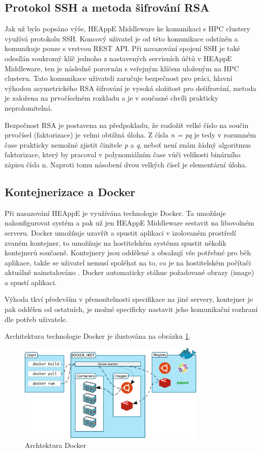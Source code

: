 \subsection{Protokol SSH a metoda šifrování RSA}
Jak už bylo popsáno výše, HEAppE Middleware ke komunikaci s HPC clustery využívá protokolu SSH. Koncový uživatel je od této komunikace odstíněn a komunikuje pouze s vrstvou REST API. Při navazování spojení SSH je také odesílán soukromý klíč jednoho z nastavených servisních účtů v HEAppE Middleware, ten je následně porovnán s veřejným klíčem uloženým na HPC clusteru. Tato komunikace uživateli zaručuje bezpečnost pro práci, hlavní výhodou asymetrického RSA šifrování je vysoká složitost pro dešifrování, metoda je založena na prvočíselném rozkladu a je v současné chvíli prakticky neprolomitelná.

Bezpečnost RSA je postavena na předpokladu, že rozložit velké číslo na součin prvočísel (faktorizace) je velmi obtížná úloha. Z čísla \emph{n = pq} je tedy v rozumném čase prakticky nemožné zjistit činitele \emph{p} a \emph{q}, neboť není znám žádný algoritmus faktorizace, který by pracoval v polynomiálním čase vůči velikosti binárního zápisu čísla n. Naproti tomu násobení dvou velkých čísel je elementární úloha.\cite{GqNaOav5DExhzgW6}

\subsection{Kontejnerizace a Docker}
Při nasazování HEAppE je využívána technologie Docker. Ta umožňuje nakonfigurovat systém a pak už jen HEAppE Middleware sestavit na libovolném serveru. Docker umožňuje uzavřít a spustit aplikaci v izolovaném prostředí zvaném kontejner, to umožňuje na hostitelském systému spustit několik kontejnerů současně. Kontejnery jsou oddělené a obsahují vše potřebné pro běh aplikace, takže se uživatel nemusí spoléhat na to, co je na hostitelském počítači aktuálně nainstalováno \cite{Ued4tuEOQL0cOIeN}. Docker automaticky stáhne požadované obrazy (image) a spustí aplikaci. 

Výhoda tkví především v přenositelnosti specifikace na jiné servery, kontejner je pak oddělen od ostatních, je možné specificky nastavit jeho komunikační rozhraní dle potřeb uživatele.

Architektura technologie Docker je ilustována na obrázku \ref{fig:docker-architecture}.

\begin{figure}
	\centering
	\includegraphics[width=0.8\textwidth]{Figures/docker-architecture.png}
	\caption{Archtektura Docker \cite{Ued4tuEOQL0cOIeN}}
	\label{fig:docker-architecture}
\end{figure}

